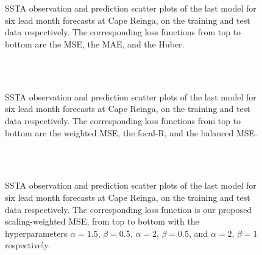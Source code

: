 \documentclass[11pt, a4paper]{article}
\begin{document}
\begin{figure}[H]
\centering
{}
\\
\\
\caption{SSTA observation and prediction scatter plots of the last model for six lead month forecasts at Cape Reinga, on the training and test data respectively. The corresponding loss functions from top to bottom are the MSE, the MAE, and the Huber.}
\end{figure}

\begin{figure}[H]
\centering
{}
\\
\\
\caption{SSTA observation and prediction scatter plots of the last model for six lead month forecasts at Cape Reinga, on the training and test data respectively. The corresponding loss functions from top to bottom are the weighted MSE, the focal-R, and the balanced MSE.}
\end{figure}

\begin{figure}[H]
\centering
{}
\\
\\
\caption{SSTA observation and prediction scatter plots of the last model for six lead month forecasts at Cape Reinga, on the training and test data respectively. The corresponding loss function is our proposed scaling-weighted MSE, from top to bottom with the hyperparameters $\alpha=1.5$, $\beta=0.5$, $\alpha=2$, $\beta=0.5$, and $\alpha=2$, $\beta=1$ respectively.}
\end{figure}
\end{document}
